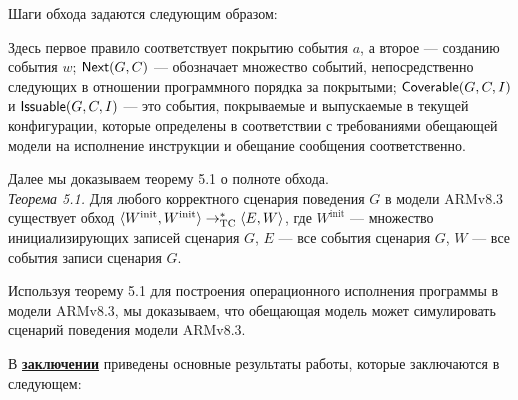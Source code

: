 Шаги обхода задаются следующим образом:
Здесь первое правило соответствует покрытию события $a$, а второе --- созданию события $w$; ${\sf Next}(G, C)$ --- обозначает множество событий,
непосредственно следующих в отношении программного порядка за покрытыми; ${\sf Coverable}(G, C, I)$ и ${\sf Issuable}(G, C, I)$ --- это
события, покрываемые и выпускаемые в текущей конфигурации, которые определены в соответствии с требованиями обещающей модели
на исполнение инструкции и обещание сообщения соответственно.

Далее мы доказываем теорему 5.1 о полноте обхода. \\
\emph{Теорема 5.1.} Для любого корректного сценария поведения $G$ в модели ARMv8.3 существует обход
${\langle{W^{\textrm{init}}, W^{\textrm{init}}}\rangle} \rightarrow_{\rm TC}^{*} {\langle{E, W}\rangle}$,
где $W^{\textrm{init}}$ --- множество инициализирующих записей сценария $G$, $E$ --- все события сценария $G$,
$W$ --- все события записи сценария $G$.

Используя теорему 5.1 для построения операционного исполнения программы в модели ARMv8.3,
мы доказываем, что обещающая модель может симулировать сценарий поведения модели ARMv8.3.



В \underline{\textbf{заключении}} приведены основные результаты работы, которые заключаются в следующем:



